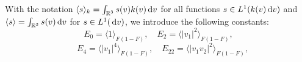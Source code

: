 



With the notation $\langle s\rangle_k = \int_{\mathbb {R}^3} s(v)k(v){\,\mathrm{d} v}$ for all functions $s\in L^1(k(v){\,\mathrm{d} v})$ and $\langle s\rangle = \int_{\mathbb {R}^3} s(v) {\,\mathrm{d} v}$ for $s\in L^1({\,\mathrm{d} v})$, we introduce the following constants:
\[E_0=\langle1\rangle_{F(1-F)},\quad E_2=\langle |v_1|^2\rangle_{F(1-F)},\]\[
\quad E_4=\langle |v_1|^4\rangle_{F(1-F)},\quad E_{22}=\langle |v_1v_2|^2\rangle_{F(1-F)},\]

